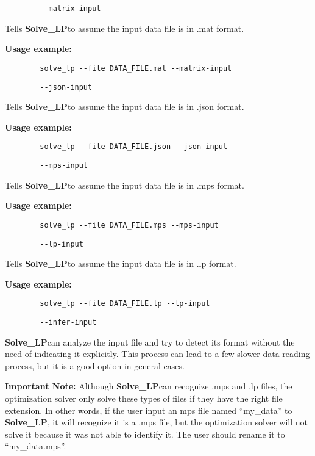 \documentclass[12pt,hidelinks]{article}
\newcommand{\SolveLP}{\textbf{Solve\_LP}}
\begin{document}
	{\color{mordantred19}
	\begin{verbatim}
		--matrix-input
	\end{verbatim}
	} Tells \SolveLP to assume the input data file is in .mat format.

	\textbf{Usage example:} 
	\begin{verbatim}
		solve_lp --file DATA_FILE.mat --matrix-input
	\end{verbatim}

	{\color{mordantred19}
	\begin{verbatim}
		--json-input
	\end{verbatim}
	} Tells \SolveLP to assume the input data file is in .json format.

	\textbf{Usage example:} 
	\begin{verbatim}
		solve_lp --file DATA_FILE.json --json-input
	\end{verbatim}

	{\color{mordantred19}
	\begin{verbatim}
		--mps-input
	\end{verbatim}
	} Tells \SolveLP to assume the input data file is in .mps format.

	\textbf{Usage example:} 
	\begin{verbatim}
		solve_lp --file DATA_FILE.mps --mps-input
	\end{verbatim}

	{\color{mordantred19}
	\begin{verbatim}
		--lp-input
	\end{verbatim}
	} Tells \SolveLP to assume the input data file is in .lp format.

	\textbf{Usage example:} 
	\begin{verbatim}
		solve_lp --file DATA_FILE.lp --lp-input
	\end{verbatim}

	{\color{mordantred19}
	\begin{verbatim}
		--infer-input
	\end{verbatim}
	} \SolveLP can analyze the input file and try to detect its format without the need of indicating it explicitly. This process can lead to a few slower data reading process, but it is a good option in general cases.

	\textbf{Important Note:} Although \SolveLP can recognize .mps and .lp files, the optimization solver only solve these types of files if they have the right file extension. In other words, if the user input an mps file named ``my\_data'' to \SolveLP, it will recognize it is a .mps file, but the optimization solver will not solve it because it was not able to identify it. The user should rename it to ``my\_data.mps''.
\end{document}
